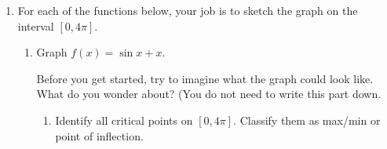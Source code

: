 \documentclass[main]{subfiles}
\begin{document}
\begin{enumerate}[resume]
\begin{enumerate}
    \begin{solution}
      By the Pythagorean Identity, the formula for $f$ simplifies to $f(x)
      = 1$, so $f'(x) = \boxed{0}$. 
    \end{solution}

  \end{enumerate}

\item 
  For each of the functions below, your job is to sketch the graph
  on the interval $[0,4\pi]$.
  \begin{enumerate}[topsep=0pt]
  \item

    \begin{problem}
      Graph $f(x)=\sin x + x$.

      Before you get started, try to imagine what the graph could look
      like. What do you wonder about? (You do not need to write this part down.
    \end{problem}

      \begin{enumerate}[topsep=0pt]
        \item
        \begin{problem}
          Identify all critical points on $[0,4\pi]$.
          Classify them as max/min or point of inflection.
        \end{problem}


\end{enumerate}
\end{enumerate}
\end{enumerate}
\end{document}
